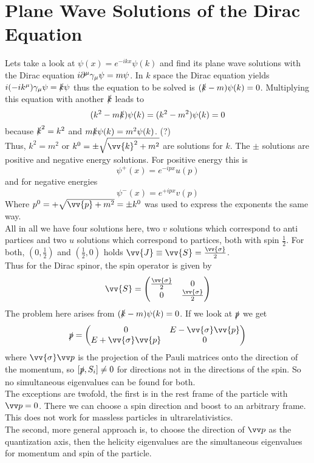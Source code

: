 \section{Plane Wave Solutions of the Dirac Equation}

Lets take a look at $\psi(x) = e^{-ikx}\psi(k)$ and find its plane wave solutions with the Dirac equation $i \partial^\mu \gamma_\mu \psi = m \psi$. In $k$ space the Dirac equation yields $i (-i k^\mu) \gamma_\mu \psi = \slashed{k} \psi$ thus the equation to be solved is $(\slashed{k} - m) \psi(k) = 0$. Multiplying this equation with another $\slashed{k}$ leads to
\[ (k^2 - m \slashed{k}) \psi(k) = (k^2 - m ^2) \psi(k)= 0 \]
because $\slashed{k}^2 = k^2$ and $m\slashed{k}\psi(k) = m^2 \psi(k)$. (?)\\
Thus, $k^2 = m^2$ or $k^0 = \pm \sqrt{ \vv{k}^2 + m ^2}$ are solutions for $k$. The $\pm$ solutions are positive and negative energy solutions. For positive energy this is
\[\psi^+(x) = e^{-ipx}u(p)\]
and for negative energies
\[ \psi^-(x) = e^{+ipx}v(p)\]
Where $p^0 = + \sqrt{\vv{p} + m^2} = \pm k^0$ was used to express the exponents the same way.\\
All in all we have four solutions here, two $v$ solutions which correspond to anti partices and two $u$ solutions which correspond to partices, both with spin $\frac{1}{2}$. For both, $\left( 0, \frac{1}{2}\right)$ and $\left(\frac{1}{2}, 0\right)$ holds $\vv{J} \equiv \vv{S} = \frac{\vv{\sigma}}{2}$.\\
Thus for the Dirac spinor, the spin operator is given by
\[ \vv{S} = \Matz{\frac{\vv{\sigma}}{2}}{0}{0}{\frac{\vv{\sigma}}{2}}\]
The problem here arises from $(\slashed{k} - m)\psi(k) = 0$. If we look at $\slashed{p}$ we get
\[ \slashed{p} = \Matz{0}{E - \vv{\sigma}\vv{p}}{E + \vv{\sigma}\vv{p}}{0}\]
where $\vv{\sigma}\vp$ is the projection of the Pauli matrices onto the direction of the momentum, so $[\slashed{p}, S_i]\neq 0$ for directions not in the directions of the spin. So no simultaneous eigenvalues can be found for both.\\
The exceptions are twofold, the first is in the rest frame of the particle with $\vp = 0$. There we can choose a spin direction and boost to an arbitrary frame. This does not work for massless particles in ultrarelativistics.\\
The second, more general approach is, to choose the direction of $\vp$ as the quantization axis, then the helicity eigenvalues are the simultaneous eigenvalues for momentum and spin of the particle.\\
